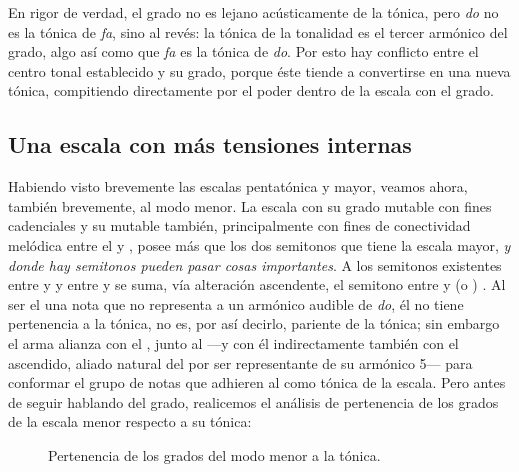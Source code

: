 \documentclass[a4paper,10pt]{article}
\begin{document}
\begin{multicols}{2}
    En rigor de verdad, el  grado no es lejano acústicamente de la tónica, pero \emph{do} no es la tónica de \emph{fa}, sino al revés: la tónica de la tonalidad es el tercer armónico del  grado, algo así como que \emph{fa} es la tónica de \emph{do}. Por esto hay conflicto entre el centro tonal establecido y su  grado, porque éste tiende a convertirse en una nueva tónica, compitiendo directamente por el poder dentro de la escala con el  grado.

    \subsection{Una escala con más tensiones internas}\label{subsec:esc-mas-tensiones}
    Habiendo visto brevemente las escalas pentatónica y mayor, veamos ahora, también brevemente, al modo menor. La escala  con su  grado mutable con fines cadenciales y su  mutable también, principalmente con fines de conectividad melódica entre el  y , posee más que los dos semitonos que tiene la escala mayor, \emph{y donde hay semitonos pueden pasar cosas importantes}. A los semitonos existentes entre  y  y entre  y  se suma, vía alteración ascendente, el semitono entre  y  (o ) \hbox{.} Al ser el  una nota que no representa a un armónico audible de \emph{do}, él no tiene pertenencia a la tónica, no es, por así decirlo, pariente de la tónica; sin embargo el  arma alianza con el , junto al  ---y con él indirectamente también con el  ascendido, aliado natural del  por ser representante de su armónico 5--- para conformar el grupo de notas que adhieren al  como tónica de la escala. Pero antes de seguir hablando del  grado, realicemos el análisis de pertenencia de los grados de la escala menor respecto a su tónica:
\end{multicols}

\begin{figure}[ht]
\centering
{}
\caption{Pertenencia de los grados del modo menor a la tónica.}\label{fig:pertenencia-menor}
\end{figure}
\end{document}
